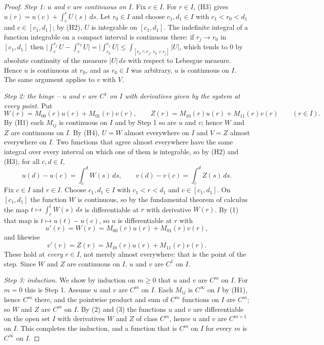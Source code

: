 \begin{proof}
\emph{Step 1: $u$ and $v$ are continuous on $I$.}  Fix $c\in I$.  For $r\in I$,
(H3) gives $u(r)=u(c)+\int_c^rU(s)\,ds$.  Let $r_0\in I$ and choose
$c_1,d_1\in I$ with $c_1<r_0<d_1$ and $c\in[c_1,d_1]$; by (H2), $U$ is
integrable on $[c_1,d_1]$.  The indefinite integral of a function integrable on
a compact interval is continuous there: if $r_j\to r_0$ in $[c_1,d_1]$ then
$\bigl|\int_c^{r_j}U-\int_c^{r_0}U\bigr|
=\bigl|\int_{r_0}^{r_j}U\bigr|\le\int_{[r_0\wedge r_j,\,r_0\vee r_j]}|U|$,
which tends to $0$ by absolute continuity of the measure $|U|\,ds$ with respect
to Lebesgue measure.  Hence $u$ is continuous at $r_0$, and as $r_0\in I$ was
arbitrary, $u$ is continuous on $I$.  The same argument applies to $v$ with
$V$.

\emph{Step 2: the hinge -- $u$ and $v$ are $C^1$ on $I$ with derivatives given
by the system at every point.}  Put
\[
  W(r)=M_{00}(r)u(r)+M_{01}(r)v(r),\qquad
  Z(r)=M_{10}(r)u(r)+M_{11}(r)v(r)\qquad(r\in I).
\]
By (H1) each $M_{ij}$ is continuous on $I$ and by Step 1 so are $u$ and $v$;
hence $W$ and $Z$ are continuous on $I$.  By (H4), $U=W$ almost everywhere on
$I$ and $V=Z$ almost everywhere on $I$.  Two functions that agree almost
everywhere have the same integral over every interval on which one of them is
integrable, so by (H2) and (H3), for all $c,d\in I$,
\begin{equation}\tag{1}
  u(d)-u(c)=\int_c^dW(s)\,ds,\qquad v(d)-v(c)=\int_c^dZ(s)\,ds .
\end{equation}
Fix $c\in I$ and $r\in I$.  Choose $c_1,d_1\in I$ with $c_1<r<d_1$ and
$c\in[c_1,d_1]$.  On $[c_1,d_1]$ the function $W$ is continuous, so by the
fundamental theorem of calculus the map $t\mapsto\int_c^tW(s)\,ds$ is
differentiable at $r$ with derivative $W(r)$.  By (1) that map is
$t\mapsto u(t)-u(c)$, so $u$ is differentiable at $r$ with
\begin{equation}\tag{2}
  u'(r)=W(r)=M_{00}(r)u(r)+M_{01}(r)v(r),
\end{equation}
and likewise
\begin{equation}\tag{3}
  v'(r)=Z(r)=M_{10}(r)u(r)+M_{11}(r)v(r).
\end{equation}
These hold at \emph{every} $r\in I$, not merely almost everywhere: that is the
point of the step.  Since $W$ and $Z$ are continuous on $I$, $u$ and $v$ are
$C^1$ on $I$.

\emph{Step 3: induction.}  We show by induction on $m\ge0$ that $u$ and $v$ are
$C^m$ on $I$.  For $m=0$ this is Step 1.  Assume $u$ and $v$ are $C^m$ on $I$.
Each $M_{ij}$ is $C^\infty$ on $I$ by (H1), hence $C^m$ there, and the
pointwise product and sum of $C^m$ functions on $I$ are $C^m$; so $W$ and $Z$
are $C^m$ on $I$.  By (2) and (3) the functions $u$ and $v$ are differentiable
on the open set $I$ with derivatives $W$ and $Z$ of class $C^m$, hence $u$ and
$v$ are $C^{m+1}$ on $I$.  This completes the induction, and a function that is
$C^m$ on $I$ for every $m$ is $C^\infty$ on $I$.
\end{proof}

